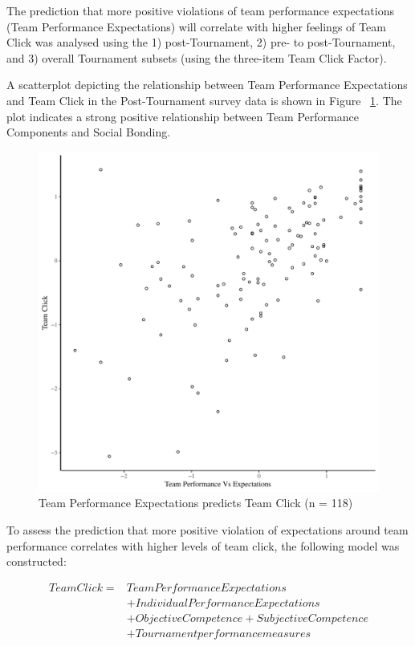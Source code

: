\begin{CJK}{UTF8}{gbsn}
The prediction that more positive violations of team performance expectations (Team Performance Expectations) will correlate with higher feelings of Team Click was analysed using the 1) post-Tournament, 2) pre- to post-Tournament, and 3) overall Tournament subsets (using the three-item Team Click Factor).

A scatterplot depicting the relationship between Team Performance Expectations and Team Click in the Post-Tournament survey data is shown in Figure ~\ref{fig:teamPerfClickBasicXY}. The plot indicates a strong positive relationship between Team Performance Components and Social Bonding.

\begin{figure}[htbp]
  \centering
\includegraphics[scale=.5]{images/teamPerfClickBasicXY.pdf}
  \caption{Team Performance Expectations predicts Team Click (n = 118)}
  \label{fig:teamPerfClickBasicXY}
\end{figure}

To assess the prediction that more positive violation of expectations around team performance correlates with higher levels of team click, the following model was constructed:


    \begin{align*}
      Team Click =  & Team Performance Expectations \\
                &+ Individual Performance Expectations \\
                &+ Objective Competence + Subjective Competence \\
                &+ Tournament performance measures \\
    \end{align*}



\end{CJK}
